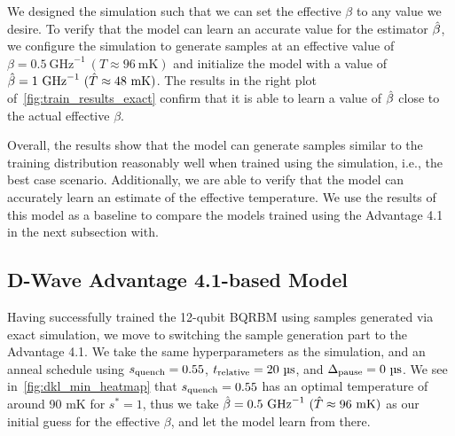We designed the simulation such that we can set the effective \( \beta \) to any value we desire.
To verify that the model can learn an accurate value for the estimator \( \hat{\beta} \), we configure the simulation to generate samples at an effective value of \( \beta = 0.5 \ \si{\giga\hertz}^{-1} \ (T \approx 96 \ \si{\milli\kelvin}) \) and initialize the model with a value of \( \hat{\beta} = 1 \ \si{\giga\hertz}^{-1} \ (\hat{T} \approx 48 \ \si{\milli\kelvin}) \).
The results in the right plot of~\cref{fig:train_results_exact} confirm that it is able to learn a value of \( \hat{\beta} \) close to the actual effective \( \beta \).

Overall, the results show that the model can generate samples similar to the training distribution reasonably well when trained using the simulation, i.e., the best case scenario.
Additionally, we are able to verify that the model can accurately learn an estimate of the effective temperature.
We use the results of this model as a baseline to compare the models trained using the Advantage 4.1 in the next subsection with.

\subsection{D-Wave Advantage 4.1-based Model}
Having successfully trained the 12-qubit BQRBM using samples generated via exact simulation, we move to switching the sample generation part to the Advantage 4.1.
We take the same hyperparameters as the simulation, and an anneal schedule using \( s_{\text{quench}} = 0.55 \), \( t_{\text{relative}} = 20 \ \si{\micro\second} \), and \( \Delta_{\text{pause}} = 0 \ \si{\micro\second} \).
We see in~\cref{fig:dkl_min_heatmap} that \( s_{\text{quench}} = 0.55 \) has an optimal temperature of around 90 \si{\milli\kelvin} for \( s^* = 1 \), thus we take \( \betahat = 0.5 \ \si{\giga\hertz}^{-1} \ (\hat{T} \approx 96 \ \si{\milli\kelvin}) \) as our initial guess for the effective \( \beta \), and let the model learn from there.

